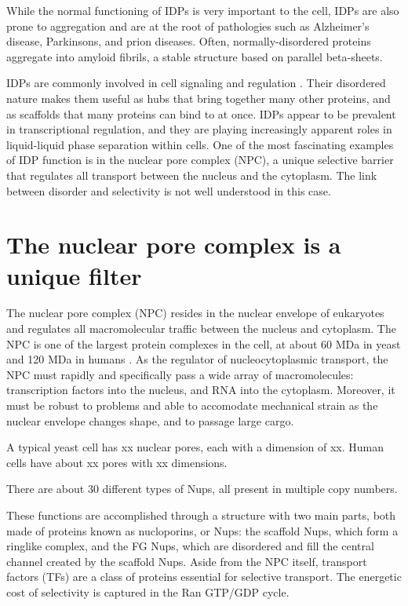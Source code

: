While the normal functioning of IDPs is very important to the cell, IDPs are also prone to aggregation and are at the root of pathologies such as Alzheimer's disease, Parkinsons, and prion diseases.  Often, normally-disordered proteins aggregate into amyloid fibrils, a stable structure based on parallel beta-sheets.

IDPs are commonly involved in cell signaling and regulation \cite{uversky13}.  Their disordered nature makes them useful as hubs that bring together many other proteins, and as scaffolds that many proteins can bind to at once.  IDPs appear to be prevalent in transcriptional regulation, and they are playing increasingly apparent roles in liquid-liquid phase separation within cells.  One of the most fascinating examples of IDP function is in the nuclear pore complex (NPC), a unique selective barrier that regulates all transport between the nucleus and the cytoplasm.  The link between disorder and selectivity is not well understood in this case.


\section{The nuclear pore complex is a unique filter}
The nuclear pore complex (NPC) resides in the nuclear envelope of eukaryotes and regulates all macromolecular traffic between the nucleus and cytoplasm.  The NPC is one of the largest protein complexes in the cell, at about 60 MDa in yeast and 120 MDa in humans \cite{beck17}.  As the regulator of nucleocytoplasmic transport, the NPC must rapidly and specifically pass a wide array of macromolecules: transcription factors into the nucleus, and RNA into the cytoplasm.  Moreover, it must be robust to problems and able to accomodate mechanical strain as the nuclear envelope changes shape, and to passage large cargo.

A typical yeast cell has xx nuclear pores, each with a dimension of xx.  Human cells have about xx pores with xx dimensions.

There are about 30 different types of Nups, all present in multiple copy numbers.

These functions are accomplished through a structure with two main parts, both made of proteins known as nucloporins, or Nups: the scaffold Nups, which form a ringlike complex, and the FG Nups, which are disordered and fill the central channel created by the scaffold Nups.  Aside from the NPC itself, transport factors (TFs) are a class of proteins essential for selective transport.  The energetic cost of selectivity is captured in the Ran GTP/GDP cycle.

